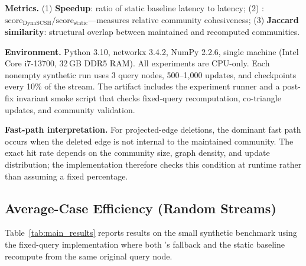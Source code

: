 \textbf{Metrics.} (1) \textbf{Speedup}: ratio of static baseline latency to \DynaSCSH latency; (2) \textbf{\qratio}: $\text{score}_{\text{DynaSCSH}} / \text{score}_{\text{static}}$---measures relative community cohesiveness; (3) \textbf{Jaccard similarity}: structural overlap between maintained and recomputed communities.

\textbf{Environment.} Python 3.10, networkx 3.4.2, NumPy 2.2.6, single machine (Intel Core i7-13700, 32\,GB DDR5 RAM). All experiments are CPU-only. Each nonempty synthetic run uses 3 query nodes, 500--1,000 updates, and checkpoints every 10\% of the stream. The artifact includes the experiment runner and a post-fix invariant smoke script that checks fixed-query recomputation, \mtindex co-triangle updates, and community validation.

\textbf{Fast-path interpretation.} For projected-edge deletions, the dominant fast path occurs when the deleted edge is not internal to the maintained community. The exact hit rate depends on the community size, graph density, and update distribution; the implementation therefore checks this condition at runtime rather than assuming a fixed percentage.

\subsection{Average-Case Efficiency (Random Streams)}

Table~\ref{tab:main_results} reports results on the small synthetic benchmark using the fixed-query implementation where both \DynaSCSH's fallback and the static baseline recompute from the same original query node.

\begin{table}[htbp]
\centering
\caption{Representative synthetic DBLP results under the fixed-query baseline. Insertion streams preserve community identity; deletion and mixed streams show natural divergence.}
\label{tab:main_results}
\end{table}

